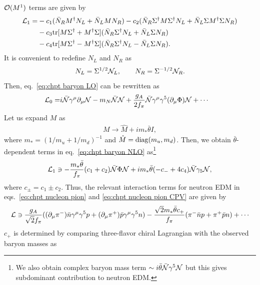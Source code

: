 \documentclass[11pt,a4paper]{article}
\begin{document}
%
${\cal O}(M^1)$ terms are given by
\begin{align}
    {\cal L}_1
    =& -c_1 (\bar N_R M^\dagger N_L + \bar N_L M N_R) - c_2 (\bar N_R \Sigma^\dagger M \Sigma^\dagger N_L + \bar N_L \Sigma M^\dagger \Sigma N_R) \nonumber\\
    & - c_3 {\rm tr}[M \Sigma^\dagger + M^\dagger \Sigma] (\bar N_R \Sigma^\dagger N_L + \bar N_L \Sigma N_R) \nonumber\\
    & - c_4 {\rm tr}[M \Sigma^\dagger - M^\dagger \Sigma] (\bar N_R \Sigma^\dagger N_L - \bar N_L \Sigma N_R). \label{eq:chpt baryon NLO}
\end{align}
%
It is convenient to redefine $N_L$ and $N_R$ as
\begin{align}
    N_L = \Sigma^{1/2} {\cal N}_L, \qquad
    N_R = \Sigma^{-1/2} {\cal N}_R.
\end{align}
Then, eq.~\eqref{eq:chpt baryon LO} can be rewritten as
\begin{align}
    {\cal L}_0 =& i \bar {\cal N} \gamma^\mu \partial_\mu {\cal N} - m_N \bar {\cal N} {\cal N}
    + \frac{g_A}{2 f_\pi} \bar {\cal N} \gamma^\mu \gamma^5 (\partial_\mu\Phi) {\cal N} + \cdots \label{eq:chpt nucleon pion}
\end{align}
Let us expand $M$ as
\begin{align}
    M \to \hat M + i m_* \bar\theta I,
\end{align}
where $m_* = (1/m_u + 1/m_d)^{-1}$ and $\hat M = {\rm diag}(m_u,m_d)$.
Then, we obtain $\bar\theta$-dependent terms in eq.~\eqref{eq:chpt baryon NLO} as\footnote{We also obtain complex baryon mass term $\sim i\bar\theta \bar{\cal N}\gamma^5 {\cal N}$ but this gives subdominant contribution to neutron EDM.}
\begin{align}
    {\cal L}_1 \ni -\frac{m_*\bar\theta}{f_\pi} (c_1 + c_2) \bar {\cal N} \Phi {\cal N} + i m_* \bar\theta (-c_- +4c_4) \bar{\cal N}\gamma_5 {\cal N}, \label{eq:chpt nucleon pion CPV}
\end{align}
where $c_\pm = c_1 \pm c_2$.
Thus, the relevant interaction terms for neutron EDM in eqs.~\eqref{eq:chpt nucleon pion} and \eqref{eq:chpt nucleon pion CPV} are given by
\begin{align}
    {\cal L} \ni
    \frac{g_A}{\sqrt{2}f_\pi} ( (\partial_\mu \pi^-) \bar n \gamma^\mu \gamma^5 p + (\partial_\mu \pi^+) \bar p \gamma^\mu \gamma^5 n)
    -\frac{\sqrt{2}m_* \bar\theta c_+}{f_\pi} (\pi^- \bar n p + \pi^+ \bar p n) + \cdots
\end{align}
$c_+$ is determined by comparing three-flavor chiral Lagrangian with the observed baryon masses as
\end{document}
